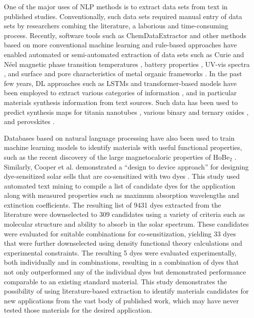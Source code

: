 \documentclass[pdflatex,sn-mathphys]{sn-jnl}%
\theoremstyle{thmstyleone}%
\theoremstyle{thmstyletwo}%
\theoremstyle{thmstylethree}%
\begin{document}
One of the major uses of NLP methods is to extract data sets from text in published studies. Conventionally, such data sets required manual entry of data sets by researchers combing the literature, a laborious and time-consuming process. Recently, software tools such as ChemDataExtractor \cite{swain2016chemdataextractor} and other methods \cite{park2018text} based on more conventional machine learning and rule-based approaches have enabled automated or semi-automated extraction of data sets such as Curie and Néel magnetic phase transition temperatures \cite{court2018auto}, battery properties \cite{huang2020database}, UV-vis spectra \cite{beard2019comparative}, and surface and pore characteristics of metal organic frameworks \cite{tayfuroglu2019silico}. In the past few years, DL approaches such as LSTMs and transformer-based models have been employed to extract various categories of information \cite{weston2019named}, and in particular materials synthesis information \cite{vaucher2020automated,he2020similarity,kononova2019text} from text sources. Such data has been used to predict synthesis maps for titania nanotubes \cite{kim2017materials}, various binary and ternary oxides \cite{kim2017virtual}, and perovskites \cite{kim2020inorganic}. 

Databases based on natural language processing have also been used to train machine learning models to identify materials with useful functional properties, such as the recent discovery of the large magnetocaloric properties of HoBe$_2$ \cite{de2020machine}. Similarly, Cooper et al. \cite{cooper2019design} demonstrated a “design to device approach” for designing dye-sensitized solar sells that are co-sensitized with two dyes \cite{cooper2019design}. This study used automated text mining to compile a list of candidate dyes for the application along with measured properties such as maximum absorption wavelengths and extinction coefficients. The resulting list of 9431 dyes extracted from the literature were downselected to 309 candidates using a variety of criteria such as molecular structure and ability to absorb in the solar spectrum. These candidates were evaluated for suitable combinations for co-sensitization, yielding 33 dyes that were further downselected using density functional theory calculations and experimental constraints. The resulting 5 dyes were evaluated experimentally, both individually and in combinations, resulting in a combination of dyes that not only outperformed any of the individual dyes but demonstrated performance comparable to an existing standard material. This study demonstrates the possibility of using literature-based extraction to identify materials candidates for new applications from the vast body of published work, which may have never tested those materials for the desired application.
\end{document}
